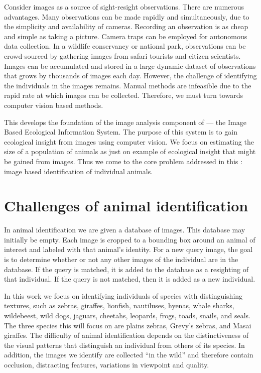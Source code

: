     Consider images as a source of sight-resight observations. There are numerous advantages. Many observations can be
    made rapidly and simultaneously, due to the simplicity and availability of cameras. Recording an observation is as
    cheap and simple as taking a picture. Camera traps can be employed for autonomous data collection. In a wildlife
    conservancy or national park, observations can be crowd-sourced by gathering images from safari tourists and citizen
    scientists. Images can be accumulated and stored in a large dynamic dataset of observations that grows by thousands
    of images each day. However, the challenge of identifying the individuals in the images remains. Manual methods are
    infeasible due to the rapid rate at which images can be collected. Therefore, we must turn towards computer vision
    based methods.

    This \thesis{} develops the foundation of the image analysis component of \IBEIS{} --- the Image Based Ecological
    Information System. The purpose of this system is to gain ecological insight from images using computer vision. We
    focus on estimating the size of a population of animals as just on example of ecological insight that might be
    gained from images. Thus we come to the core problem addressed in this \thesis{}: image based identification of
    individual animals.

\section{Challenges of animal identification}\label{sec:challenges}

    In animal identification we are given a database of images. This database may initially be empty. Each image is
    cropped to a bounding box around an animal of interest and labeled with that animal's identity. For a new query
    image, the goal is to determine whether or not any other images of the individual are in the database. If the query
    is matched, it is added to the database as a resighting of that individual. If the query is not matched, then it is
    added as a new individual.

    In this work we focus on identifying individuals of species with distinguishing textures, such as zebras, giraffes,
    lionfish, nautiluses, hyenas, whale sharks, wildebeest, wild dogs, jaguars, cheetahs, leopards, frogs, toads,
    snails, and seals. The three species this \thesis{} will focus on are plains zebras, Grevy's zebras, and Masai
    giraffes. The difficulty of animal identification depends on the distinctiveness of the visual patterns that
    distinguish an individual from others of its species. In addition, the images we identify are collected ``in the
    wild'' and therefore contain occlusion, distracting features, variations in viewpoint and quality.

